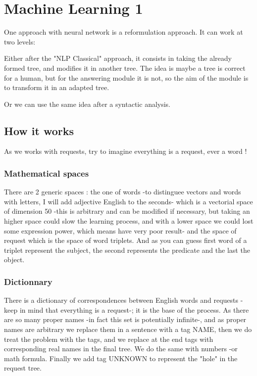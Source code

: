 \section{Machine Learning 1}

One approach with neural network is a reformulation approach. It can work at two levels: 

Either after the "NLP Classical" approach, it consists in taking the already formed tree, and modifies it in another tree. The idea is maybe a tree is correct for a human, but for the answering module it is not, so the aim of the module is to transform it in an adapted tree.

Or we can use the same idea after a syntactic analysis. 

\subsection{How it works}

As we works with requests, try to imagine everything is a request, ever a word !

\subsubsection{Mathematical spaces}

There are 2 generic spaces : the one of words -to distinguee vectors and words with letters, I will add adjective English to the seconds- which is a vectorial space of dimension 50 -this is arbitrary and can be modified if necessary, but taking an higher space could slow the learning process, and with a lower space we could lost some expression power, which means have very poor result- and the space of request which is the space of word triplets. And as you can guess first word of a triplet represent the subject, the second represents the predicate and the last the object.

\subsubsection{Dictionnary}

There is a dictionary of correspondences between English words and requests -keep in mind that everything is a request-; it is the base of the process. As there are so many proper names -in fact this set is potentially infinite-, and as proper names are arbitrary we replace them in a sentence with a tag NAME, then we do treat the problem with the tags, and we replace at the end tags with corresponding real names in the final tree. We do the same with numbers -or math formula. Finally we add tag UNKNOWN to represent the "hole" in the request tree.

